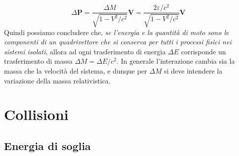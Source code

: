 \documentclass[a4paper,11pt]{book}
\theoremstyle{plain}
\theoremstyle{definition}
\begin{document}
\[
\Delta \textbf{P} = \frac{\Delta M}{\sqrt{1-V^2/c^2}}\textbf{V} = \frac{2\varepsilon/c^2}{\sqrt{1-V^2/c^2}}\textbf{V}
\]
Quindi possiamo concludere che, \emph{se l'energia e la quantità di moto sono le componenti di un quadrivettore che si conserva per tutti i processi fisici nei sistemi isolati}, allora ad ogni trasferimento di energia $\Delta E$ corrisponde un trasferimento di massa $\Delta M = \Delta E /c^2$. In generale l'interazione cambia sia la massa che la velocità del sistema, e dunque per $\Delta M$ si deve intendere la variazione della massa relativistica. 
\section{Collisioni}
\subsection{Energia di soglia}
\end{document}
